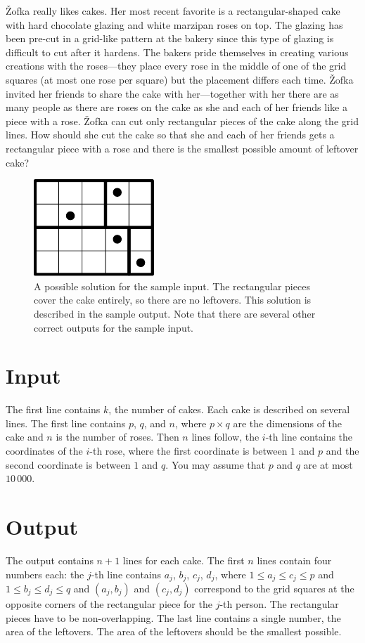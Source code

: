 
Žofka really likes cakes. Her most recent favorite is a
rectangular-shaped cake with hard chocolate glazing and white marzipan
roses on top. The glazing has been pre-cut in a grid-like pattern at
the bakery since this type of glazing is difficult to cut after it
hardens. The bakers pride themselves in creating various creations
with the roses---they place every rose in the middle of one of the
grid squares (at most one rose per square) but the placement differs
each time. Žofka invited her friends to share the cake with
her---together with her there are as many people as there are roses on
the cake as she and each of her friends like a piece with a
rose. Žofka can cut only rectangular pieces of the cake along the grid
lines.  How should she cut the cake so that she and each of her
friends gets a rectangular piece with a rose and there is the smallest
possible amount of leftover cake?

\begin{figure}[h]
  \centering
  \includegraphics{cake}
  \caption{A possible solution for the sample input. The rectangular
    pieces cover the cake entirely, so there are no leftovers. This
    solution is described in the sample output. Note that there are
    several other correct outputs for the sample input.}
\label{fig:sample1}
\end{figure}

\section*{Input}

The first line contains $k$, the number of cakes. Each cake is
described on several lines. The first line contains $p$, $q$, and $n$,
where $p \times q$ are the dimensions of the cake and $n$ is the
number of roses. Then $n$ lines follow, the $i$-th line contains the
coordinates of the $i$-th rose, where the first coordinate is between
$1$ and $p$ and the second coordinate is between $1$ and $q$. You may
assume that $p$ and $q$ are at most $10\,000$.

\section*{Output}

The output contains $n + 1$ lines for each cake. The first $n$ lines
contain four numbers each: the $j$-th line contains $a_j$, $b_j$,
$c_j$, $d_j$, where $1 \leq a_j \leq c_j \leq p$ and
$1 \leq b_j \leq d_j \leq q$ and $(a_j, b_j)$ and $(c_j, d_j)$
correspond to the grid squares at the opposite corners of the
rectangular piece for the $j$-th person. The rectangular pieces have
to be non-overlapping. The last line contains a single number, the
area of the leftovers. The area of the leftovers should be the
smallest possible.
